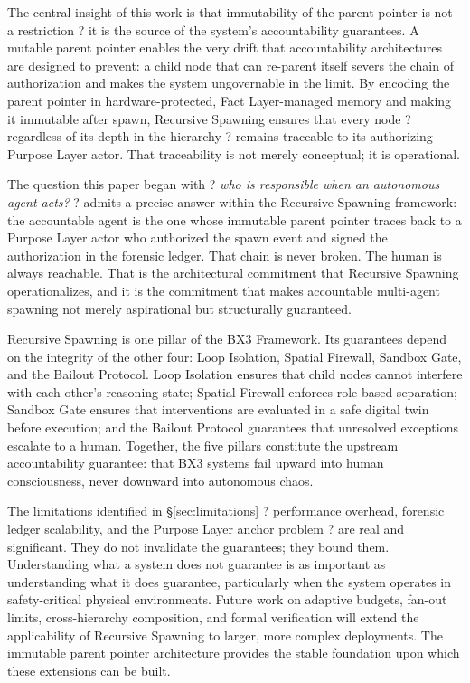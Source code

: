 The central insight of this work is that immutability of the parent pointer is not a restriction ? it is the source of the system's accountability guarantees. A mutable parent pointer enables the very drift that accountability architectures are designed to prevent: a child node that can re-parent itself severs the chain of authorization and makes the system ungovernable in the limit. By encoding the parent pointer in hardware-protected, Fact Layer-managed memory and making it immutable after spawn, Recursive Spawning ensures that every node ? regardless of its depth in the hierarchy ? remains traceable to its authorizing Purpose Layer actor. That traceability is not merely conceptual; it is operational.

The question this paper began with ? \textit{who is responsible when an autonomous agent acts?} ? admits a precise answer within the Recursive Spawning framework: the accountable agent is the one whose immutable parent pointer traces back to a Purpose Layer actor who authorized the spawn event and signed the authorization in the forensic ledger. That chain is never broken. The human is always reachable. That is the architectural commitment that Recursive Spawning operationalizes, and it is the commitment that makes accountable multi-agent spawning not merely aspirational but structurally guaranteed.

Recursive Spawning is one pillar of the BX3 Framework. Its guarantees depend on the integrity of the other four: Loop Isolation, Spatial Firewall, Sandbox Gate, and the Bailout Protocol. Loop Isolation ensures that child nodes cannot interfere with each other's reasoning state; Spatial Firewall enforces role-based separation; Sandbox Gate ensures that interventions are evaluated in a safe digital twin before execution; and the Bailout Protocol guarantees that unresolved exceptions escalate to a human. Together, the five pillars constitute the upstream accountability guarantee: that BX3 systems fail upward into human consciousness, never downward into autonomous chaos.

The limitations identified in \S\ref{sec:limitations} ? performance overhead, forensic ledger scalability, and the Purpose Layer anchor problem ? are real and significant. They do not invalidate the guarantees; they bound them. Understanding what a system does not guarantee is as important as understanding what it does guarantee, particularly when the system operates in safety-critical physical environments. Future work on adaptive budgets, fan-out limits, cross-hierarchy composition, and formal verification will extend the applicability of Recursive Spawning to larger, more complex deployments. The immutable parent pointer architecture provides the stable foundation upon which these extensions can be built.